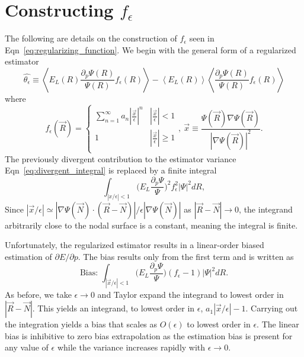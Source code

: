 \documentclass[twocolumn]{revtex4-1}
\begin{document}
%


\appendix*
\section{Constructing $f_\epsilon$}
The following are details on the construction of $f_\epsilon$ seen in Eqn~\ref{eq:regularizing_function}. 
We begin with the general form of a regularized estimator
$$
\hat{\theta_\epsilon} \equiv
\left\langle E_L(R) \frac{\partial_p \Psi(R)}{\Psi(R)} f_\epsilon(R) \right\rangle - \left\langle E_L(R) \right \rangle \left \langle \frac{\partial_p \Psi(R)}{\Psi(R)} f_\epsilon(R) \right\rangle
$$
where 
\begin{equation}
f_\epsilon(\vec{R}) = \begin{cases} 
      \sum_{n=1}^{\infty} a_n |\frac{\vec{x}}{\epsilon}|^n & |\frac{\vec{x}}{\epsilon}| < 1 \\
      1 & |\frac{\vec{x}}{\epsilon}| \ge 1 \\
   \end{cases},\ \vec{x} \equiv \frac{\Psi(\vec{R})\nabla \Psi(\vec{R})}{|\nabla \Psi(\vec{R})|^2}.
\end{equation} 
The previously divergent contribution to the estimator variance Eqn~\ref{eq:divergent_integral} is replaced by a finite integral
$$ \int_{|x/\epsilon|< 1} \Big(E_L\frac{\partial_p\Psi}{\Psi}\Big)^2 f_\epsilon^2 |\Psi|^2 dR,
$$
Since $|\vec{x}/\epsilon| \simeq |\nabla\Psi(\vec{N}) \cdot (\vec{R}-\vec{N})|/\epsilon|\nabla  \Psi(\vec{N})|$ as $|\vec{R} - \vec{N}| \rightarrow 0$, the integrand arbitrarily close to the nodal surface is a constant, meaning the integral is finite.

Unfortunately, the regularized estimator results in a linear-order biased estimation of $\partial E/\partial p$.
The bias results only from the first term and is written as 
$$
\text{Bias: } \int_{|\vec{x}/\epsilon|< 1} \Big(E_L\frac{\partial_p\Psi}{\Psi}\Big) (f_\epsilon - 1)|\Psi|^2 dR.
$$
As before, we take $\epsilon \rightarrow 0$ and Taylor expand the integrand to lowest order in $|\vec{R}-\vec{N}|$.
This yields an integrand, to lowest order in $\epsilon$, $a_1|\vec{x}/\epsilon| - 1$.
Carrying out the integration yields a bias that scales as $O(\epsilon)$ to lowest order in $\epsilon$.
The linear bias is inhibitive to zero bias extrapolation as the estimation bias is present for any value of $\epsilon$ while the variance increases rapidly with $\epsilon \rightarrow 0$.
\end{document}
